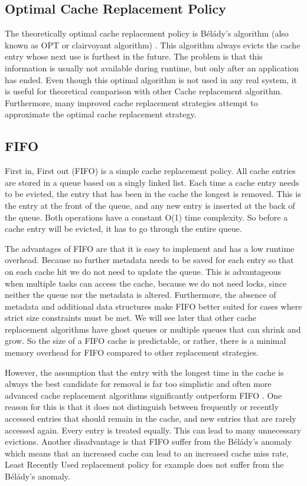 \documentclass[
	12pt,
	a4paper,
	abstract,
	bibliography=totoc,
	chapterprefix,
	headings=openright,
	numbers=endperiod,
	parskip=half,
	twoside,
]{scrreprt}
\begin{document}
\subsection{Optimal Cache Replacement Policy}
The theoretically optimal cache replacement policy is Bélády's algorithm (also known as OPT or clairvoyant algorithm) \cite{belady1966study}.
This algorithm always evicts the cache entry whose next use is furthest in the future.
The problem is that this information is usually not available during runtime, but only after an application has ended.
Even though this optimal algorithm is not used in any real system, it is useful for theoretical comparison with other 
Cache replacement algorithm.
Furthermore, many improved cache replacement strategies attempt to approximate the optimal cache replacement strategy.

\subsection{FIFO}

First in, First out (FIFO) is a simple cache replacement policy.
All cache entries are stored in a queue based on a singly linked list.
Each time a cache entry needs to be evicted, the entry that has been in the cache the longest is removed.
This is the entry at the front of the queue, and any new entry is inserted at the back of the queue. Both operations have a constant O(1) time complexity.
So before a cache entry will be evicted, it has to go through the entire queue.

The advantages of FIFO are that it is easy to implement and has a low runtime overhead.
Because no further metadata needs to be saved for each entry so that on each cache hit we do not need to update the queue.
This is advantageous when multiple tasks can access the cache, 
because we do not need locks, since neither the queue nor the metadata is altered.
Furthermore, the absence of metadata and additional data structures make FIFO better suited for cases where strict size constraints must be met. 
We will see later that other cache replacement algorithms have ghost queues or multiple queues that can shrink and grow. So the size 
of a FIFO cache is predictable, or rather, there is a minimal memory overhead for FIFO compared to other replacement strategies.

However, the assumption that the entry with the longest time in the cache is always the best candidate for removal is far too 
simplistic and often more advanced cache replacement algorithms significantly outperform FIFO \cite{van1992lru}.
One reason for this is that it does not distinguish between frequently or recently accessed entries that should remain in the cache, and new entries that are rarely accessed again. Every entry is treated equally. This can lead to many unnecessary evictions.
Another disadvantage is that FIFO suffer from the Bélády's anomaly \cite{10.1145/363011.363155} which means that an increased cache can lead to an increased cache miss rate, Least Recently Used replacement policy for example does not suffer from the Bélády's anomaly.
\end{document}
